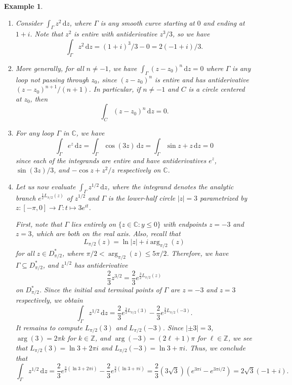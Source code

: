 \documentclass[10pt]{article}
\newcommand{\C}{\mathbb{C}}
\newcommand{\Z}{\mathbb{Z}}
\newcommand{\dd}{\,\mathrm{d}}
\theoremstyle{newstyle}
\newtheorem{exmp}[thm]{Example}
\begin{document}
\begin{exmp}~
\begin{enumerate}[(1)]
    \item Consider $\int_\Gamma z^2 \dd z$, where $\Gamma$ is any smooth curve starting at $0$ and 
    ending at $1+i$. Note that $z^2$ is entire with antiderivative $z^3/3$, so we have 
    \[ \int_\Gamma z^2\dd z = (1+i)^3/3 - 0 = 2(-1+i)/3. \]
    \item More generally, for all $n \neq -1$, we have $\int_\Gamma (z-z_0)^n\dd z = 0$ where 
    $\Gamma$ is any loop not passing through $z_0$, since $(z-z_0)^n$ is entire 
    and has antiderivative $(z-z_0)^{n+1}/(n+1)$. In particular, if $n \neq -1$ and $C$ is a 
    circle centered at $z_0$, then 
    \[ \int_C (z - z_0)^n \dd z = 0. \]
    \item For any loop $\Gamma$ in $\C$, we have 
    \[ \int_\Gamma e^z \dd z = \int_\Gamma \cos(3z)\dd z = \int_\Gamma \sin z + z\dd z = 0 \]
    since each of the integrands are entire and have antiderivatives $e^z$, $\sin(3z)/3$, and 
    $-\cos z + z^2/z$ respectively on $\C$. 
    \item Let us now evaluate 
    $\int_\Gamma z^{1/2}\dd z$,
    where the integrand denotes the analytic branch $e^{\frac12 L_{\pi/2}(z)}$ of $z^{1/2}$
    and $\Gamma$ is the lower-half circle $|z| = 3$ parametrized by $z : [-\pi, 0]
    \to \Gamma : t \mapsto 3e^{it}$. 
    
    First, note that $\Gamma$ lies entirely on $\{z \in \C : y \leq 0\}$ with endpoints 
    $z = -3$ and $z = 3$, which are both on the real axis. Also, recall that 
    \[ L_{\pi/2}(z) = \ln|z| + i\arg_{\pi/2}(z) \]
    for all $z \in D_{\pi/2}^*$, where $\pi/2 < \arg_{\pi/2}(z) \leq 5\pi/2$. Therefore, we have 
    $\Gamma \subseteq D_{\pi/2}^*$, and $z^{1/2}$ has antiderivative 
    \[ \frac23 z^{3/2} = \frac23 e^{\frac32 L_{\pi/2}(z)} \]
    on $D_{\pi/2}^*$. Since the initial and terminal points of $\Gamma$ are $z = -3$ and $z = 3$ 
    respectively, we obtain 
    \[ \int_\Gamma z^{1/2} \dd z = \frac23 e^{\frac32 L_{\pi/2}(3)} - 
    \frac23 e^{\frac32 L_{\pi/2}(-3)}. \]
    It remains to compute $L_{\pi/2}(3)$ and $L_{\pi/2}(-3)$. Since $|\pm3| = 3$, 
    $\arg(3) = 2\pi k$ for $k \in \Z$, and $\arg(-3) = (2\ell + 1)\pi$ for $\ell \in \Z$, we see that 
    $L_{\pi/2}(3) = \ln3 + 2\pi i$ and $L_{\pi/2}(-3) = \ln3 + \pi i$. Thus, we conclude that 
    \[ \int_\Gamma z^{1/2}\dd z 
    = \frac23 e^{\frac32(\ln3 + 2\pi i)} - \frac23 e^{\frac32(\ln3 + \pi i)} 
    = \frac23 (3\sqrt3)(e^{3\pi i} - e^{3\pi i/2}) = 2\sqrt3 (-1 + i). \]
\end{enumerate}
\end{exmp}
\end{document}
